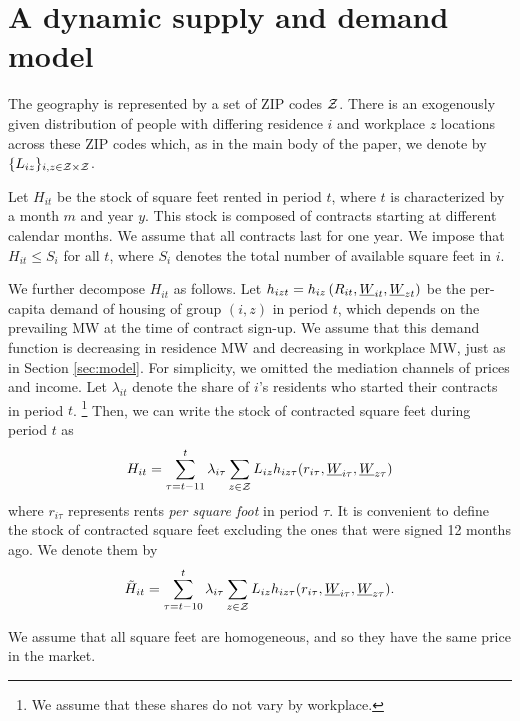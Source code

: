 
\section{A dynamic supply and demand model}\label{sec:dyn_theory_model}

The geography is represented by a set of ZIP codes $\mathcal{Z}$.
There is an exogenously given distribution of people with differing 
residence $i$ and 
workplace $z$ locations across these ZIP codes which,
as in the main body of the paper, we denote by $\{L_{iz}\}_{i,z\in\mathcal{Z}\times\mathcal{Z}}$.

Let $H_{it}$ be the stock of square feet rented in period $t$, where $t$ is 
characterized by a month $m$ and year $y$.
This stock is composed of contracts starting at different calendar months. 
We assume that all contracts last for one year.
We impose that $H_{it} \leq S_i$ for all $t$, 
where $S_i$ denotes the total number of available square feet in $i$.

We further decompose $H_{it}$ as follows.
Let $h_{izt} = h_{iz}\left(R_{it}, \underline{W}_{it}, \underline{W}_{zt}\right)$ be the 
per-capita demand of housing of group $(i,z)$ in period $t$,
which depends on the prevailing MW at the time of contract sign-up.
We assume that this demand function is decreasing in residence MW and decreasing
in workplace MW, just as in Section \ref{sec:model}.
For simplicity, we omitted the mediation channels of prices and income.
Let $\lambda_{it}$ denote the share of $i$'s residents who started their contracts 
in period $t$.%
\footnote{We assume that these shares do not vary by workplace.}
Then, we can write the stock of contracted square feet during period $t$ as
$$
H_{it} = \sum_{\tau = t - 11}^{t} \lambda_{i\tau} \sum_{z\in\mathcal{Z}} L_{iz} 
h_{iz\tau} (r_{i\tau}, \underline{W}_{i\tau}, \underline{W}_{z\tau})
$$
where 
$r_{i\tau}$ represents rents \textit{per square foot} in period $\tau$.
It is convenient to define the stock of contracted square feet excluding the ones 
that were signed 12 months ago. We denote them by
$$
\tilde H_{it} = \sum_{\tau = t - 10}^{t} \lambda_{i\tau} \sum_{z\in\mathcal{Z}} L_{iz} 
h_{iz\tau} (r_{i\tau}, \underline{W}_{i\tau}, \underline{W}_{z\tau}) .
$$

We assume that all square feet are homogeneous, and so they have the same price 
in the market.

